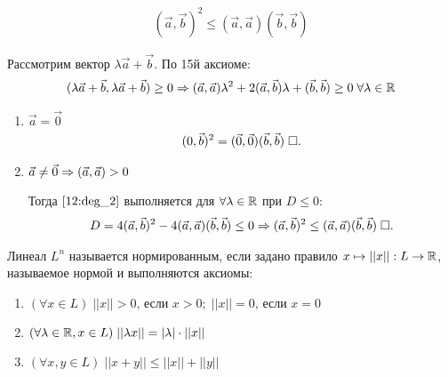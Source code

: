 \documentclass{article}
\begin{document}

\begin{align*}
	(\vec{a},\vec{b})^{2}\leq (\vec{a},\vec{a})(\vec{b},\vec{b})
\end{align*}

\proof

Рассмотрим вектор $\lambda\vec{a}+\vec{b}$. По 15й аксиоме:
\begin{align}
	\label{12:deg_2}
	(\lambda\vec{a}+\vec{b},\lambda\vec{a}+\vec{b})\geq 0\Rarr(\vec{a},\vec{a})\lambda^{2}+2(\vec{a},\vec{b})\lambda+(\vec{b},\vec{b})\geq 0\;\forall\lambda\in\R
\end{align}

\begin{enumerate}
	\item{}$\vec{a}=\vec{0}$
	\begin{align*}
		(0,\vec{b})^{2}=(\vec{0},\vec{0})(\vec{b},\vec{b})\qed
	\end{align*}
	\item{}$\vec{a}\neq \vec{0}\Rarr(\vec{a},\vec{a})>0$

	Тогда $\eqref{12:deg_2}$ выполняется для $\forall\lambda\in\R$ при $D\leq 0$:
	\begin{align*}
		D=4(\vec{a},\vec{b})^{2}-4(\vec{a},\vec{a})(\vec{b},\vec{b})\leq 0\Rarr(\vec{a},\vec{b})^{2}\leq(\vec{a},\vec{a})(\vec{b},\vec{b})\qed
	\end{align*}
\end{enumerate}

\pagebreak


Линеал $L^{n}$ называется нормированным, если задано правило $x\mapsto||x||:L\to\R$, называемое нормой и выполняются аксиомы:
\begin{enumerate}[label=\Roman*.]
	\item{}$(\forall x\in L)\;||x||>0\text{, если } x>0;\;||x||=0\text{, если }x=0$
	\item{}$(\forall \lambda\in\R,x\in L)\;||\lambda x||=|\lambda|\cdot||x||$
	\item{}$(\forall x,y\in L)\;||x+y||\leq ||x||+||y||$
\end{enumerate}
\end{document}
